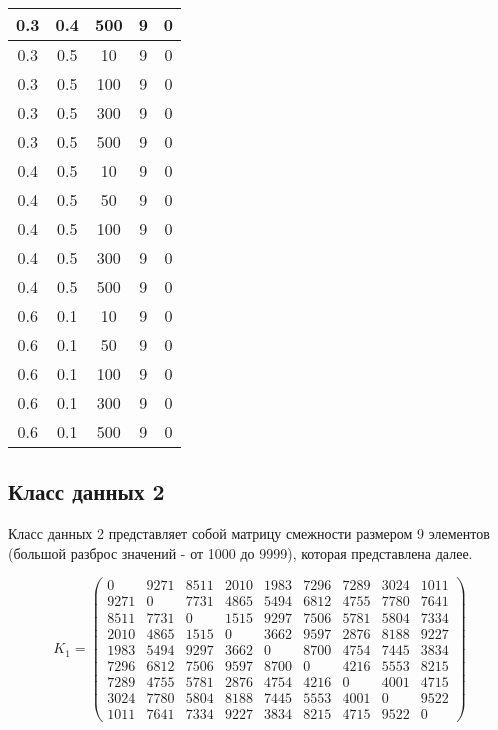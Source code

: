 \begin{center}
\begin{longtable}[c]{|c|c|c|c|c|}
		0.3 & 0.4 & 500 &    9 &    0 \\ \hline
		0.3 & 0.5 &  10 &    9 &    0 \\
		0.3 & 0.5 & 100 &    9 &    0 \\
		0.3 & 0.5 & 300 &    9 &    0 \\
		0.3 & 0.5 & 500 &    9 &    0 \\ \hline
		0.4 & 0.5 &  10 &    9 &    0 \\
		0.4 & 0.5 &  50 &    9 &    0 \\
		0.4 & 0.5 & 100 &    9 &    0 \\
		0.4 & 0.5 & 300 &    9 &    0 \\
		0.4 & 0.5 & 500 &    9 &    0 \\ \hline
		0.6 & 0.1 &  10 &    9 &    0 \\
		0.6 & 0.1 &  50 &    9 &    0 \\
		0.6 & 0.1 & 100 &    9 &    0 \\
		0.6 & 0.1 & 300 &    9 &    0 \\
		0.6 & 0.1 & 500 &    9 &    0 \\ \hline
	\end{longtable}
\end{center}


\subsection{Класс данных 2}

Класс данных 2 представляет собой матрицу смежности размером 9 элементов (большой разброс значений - от 1000 до 9999), которая представлена далее.

\begin{equation}
	\label{eq:kd2}
	K_{1} = \begin{pmatrix}
		0 & 9271 & 8511 & 2010 & 1983 & 7296 & 7289 & 3024 & 1011 \\
		9271 & 0 & 7731 & 4865 & 5494 & 6812 & 4755 & 7780 & 7641 \\
		8511 & 7731 & 0 & 1515 & 9297 & 7506 & 5781 & 5804 & 7334 \\
		2010 & 4865 & 1515 & 0 & 3662 & 9597 & 2876 & 8188 & 9227 \\
		1983 & 5494 & 9297 & 3662 & 0 & 8700 & 4754 & 7445 & 3834 \\
		7296 & 6812 & 7506 & 9597 & 8700 & 0 & 4216 & 5553 & 8215 \\
		7289 & 4755 & 5781 & 2876 & 4754 & 4216 & 0 & 4001 & 4715 \\
		3024 & 7780 & 5804 & 8188 & 7445 & 5553 & 4001 & 0 & 9522 \\
		1011 & 7641 & 7334 & 9227 & 3834 & 8215 & 4715 & 9522 & 0 
	\end{pmatrix}
\end{equation}


